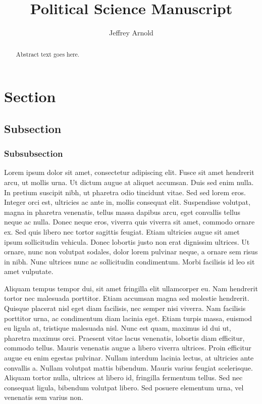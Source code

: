 \documentclass[12pt,letterpaper,]{article}
\title{Political Science Manuscript}
\author{Jeffrey Arnold}
\date{}
\begin{document}
\maketitle

\begin{abstract}
Abstract text goes here.
\end{abstract}
\thispagestyle{empty}
\clearpage

\setcounter{page}{1}


\section{Section}\label{section}

\subsection{Subsection}\label{subsection}

\subsubsection{Subsubsection}\label{subsubsection}

Lorem ipsum dolor sit amet, consectetur adipiscing elit. Fusce sit amet
hendrerit arcu, ut mollis urna. Ut dictum augue at aliquet accumsan.
Duis sed enim nulla. In pretium suscipit nibh, ut pharetra odio
tincidunt vitae. Sed sed lorem eros. Integer orci est, ultricies ac ante
in, mollis consequat elit. Suspendisse volutpat, magna in pharetra
venenatis, tellus massa dapibus arcu, eget convallis tellus neque ac
nulla. Donec neque eros, viverra quis viverra sit amet, commodo ornare
ex. Sed quis libero nec tortor sagittis feugiat. Etiam ultricies augue
sit amet ipsum sollicitudin vehicula. Donec lobortis justo non erat
dignissim ultrices. Ut ornare, nunc non volutpat sodales, dolor lorem
pulvinar neque, a ornare sem risus in nibh. Nunc ultrices nunc ac
sollicitudin condimentum. Morbi facilisis id leo sit amet vulputate.

Aliquam tempus tempor dui, sit amet fringilla elit ullamcorper eu. Nam
hendrerit tortor nec malesuada porttitor. Etiam accumsan magna sed
molestie hendrerit. Quisque placerat nisl eget diam facilisis, nec
semper nisi viverra. Nam facilisis porttitor urna, ac condimentum diam
lacinia eget. Etiam turpis massa, euismod eu ligula at, tristique
malesuada nisl. Nunc est quam, maximus id dui ut, pharetra maximus orci.
Praesent vitae lacus venenatis, lobortis diam efficitur, commodo tellus.
Mauris venenatis augue a libero viverra ultrices. Proin efficitur augue
eu enim egestas pulvinar. Nullam interdum lacinia lectus, at ultricies
ante convallis a. Nullam volutpat mattis bibendum. Mauris varius feugiat
scelerisque. Aliquam tortor nulla, ultrices at libero id, fringilla
fermentum tellus. Sed nec consequat ligula, bibendum volutpat libero.
Sed posuere elementum urna, vel venenatis sem varius non.
\end{document}
